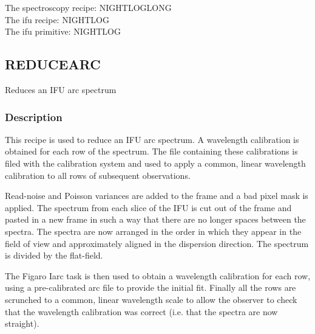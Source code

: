 \documentclass[twoside,11pt]{article}
\renewcommand{\_}{\texttt{\symbol{95}}}
\begin{document}
The spectroscopy recipe: NIGHT\_LOG\_LONG\\
The ifu recipe: NIGHT\_LOG\\
The ifu primitive: \_NIGHT\_LOG\_



\clearpage

\subsection{REDUCE\_ARC}



Reduces an IFU arc spectrum

\subsubsection*{Description}

This recipe is used to reduce an IFU arc spectrum. A wavelength
calibration is obtained for each row of the spectrum. The file
containing these calibrations is filed with the calibration system and
used to apply a common, linear wavelength calibration to all rows of
subsequent observations.



Read-noise and Poisson variances are added to the frame and a bad
pixel mask is applied. The spectrum from each slice of the IFU is cut
out of the frame and pasted in a new frame in such a way that there
are no longer spaces between the spectra. The spectra are now arranged
in the order in which they appear in the field of view and
approximately aligned in the dispersion direction. The spectrum is
divided by the flat-field.



The Figaro Iarc task is then used to obtain a wavelength calibration for
each row, using a pre-calibrated arc file to provide the initial
fit. Finally all the rows are scrunched to a common, linear wavelength
scale to allow the observer to check that the wavelength calibration
was correct (i.e. that the spectra are now straight).
\end{document}
